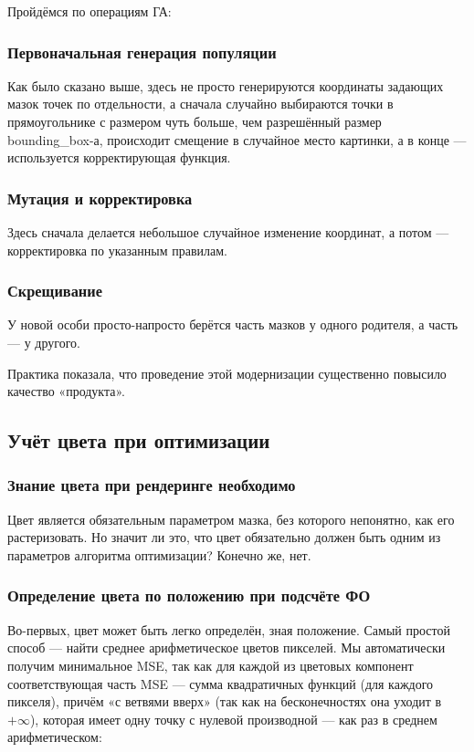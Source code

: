 Пройдёмся по операциям ГА:

\subsubsection{Первоначальная генерация популяции}
Как было сказано выше, здесь не просто генерируются координаты задающих мазок точек по отдельности,
а сначала случайно выбираются точки в прямоугольнике с размером чуть больше, чем разрешённый размер bounding\_box-а,
происходит смещение в случайное место картинки,
а в конце — используется корректирующая функция.

\subsubsection{Мутация и корректировка}
Здесь сначала делается небольшое случайное изменение координат, а потом — корректировка по указанным правилам.

\subsubsection{Скрещивание}
У новой особи просто-напросто берётся часть мазков у одного родителя, а часть — у другого.

Практика показала, что проведение этой модернизации существенно повысило качество «продукта».



\subsection{Учёт цвета при оптимизации}\label{subsec:color_in_genome}

\subsubsection{Знание цвета при рендеринге необходимо}
Цвет является обязательным параметром мазка, без которого непонятно, как его растеризовать.
Но значит ли это, что цвет обязательно должен быть одним из параметров алгоритма оптимизации?
Конечно же, нет.

\subsubsection{Определение цвета по положению при подсчёте ФО}\label{subsubsec:optimal-color-finding}
Во-первых, цвет может быть легко определён, зная положение.
Самый простой способ — найти среднее арифметическое цветов пикселей.
Мы автоматически получим минимальное MSE,
так как для каждой из цветовых компонент соответствующая часть MSE — сумма квадратичных функций (для каждого пикселя),
причём «с ветвями вверх» (так как на бесконечностях она уходит в $+ \infty$), которая имеет одну точку с нулевой производной — как раз в среднем арифметическом:

